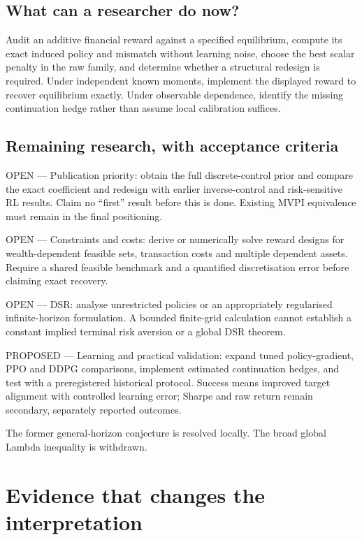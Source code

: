 \documentclass[11pt,a4paper]{article}
\theoremstyle{plain}
\theoremstyle{definition}
\theoremstyle{remark}
\begin{document}
\subsection{What can a researcher do now?}
Audit an additive financial reward against a specified equilibrium, compute its exact induced policy and mismatch without learning noise, choose the best scalar penalty in the raw family, and determine whether a structural redesign is required. Under independent known moments, implement the displayed reward to recover equilibrium exactly. Under observable dependence, identify the missing continuation hedge rather than assume local calibration suffices.

\subsection{Remaining research, with acceptance criteria}
OPEN --- Publication priority: obtain the full discrete-control prior and compare the exact coefficient and redesign with earlier inverse-control and risk-sensitive RL results. Claim no ``first'' result before this is done. Existing MVPI equivalence must remain in the final positioning.

OPEN --- Constraints and costs: derive or numerically solve reward designs for wealth-dependent feasible sets, transaction costs and multiple dependent assets. Require a shared feasible benchmark and a quantified discretisation error before claiming exact recovery.

OPEN --- DSR: analyse unrestricted policies or an appropriately regularised infinite-horizon formulation. A bounded finite-grid calculation cannot establish a constant implied terminal risk aversion or a global DSR theorem.

PROPOSED --- Learning and practical validation: expand tuned policy-gradient, PPO and DDPG comparisons, implement estimated continuation hedges, and test with a preregistered historical protocol. Success means improved target alignment with controlled learning error; Sharpe and raw return remain secondary, separately reported outcomes.

The former general-horizon conjecture is resolved locally. The broad global Lambda inequality is withdrawn.


\clearpage

\section{Evidence that changes the interpretation}
\end{document}
